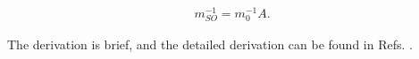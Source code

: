 \documentclass[a4paper, 12pt, titlepage,oneside,drop]{kthesis}
\begin{document}
\begin{equation}\begin{split}
m_{SO}^{-1} = {m_0^{-1}}A.
 \end{split}
\end{equation}


The derivation is brief, and the detailed derivation can be found in Refs. \cite{fospamp2010, suzuki1995first, dresselhaus1955cyclotron, persson1997relativistic}.


 

\end{document}
